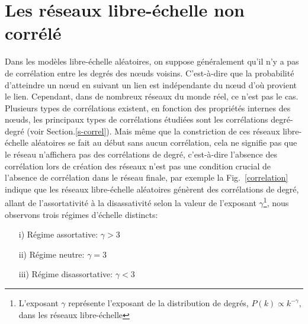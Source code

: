 \section{Les réseaux libre-échelle non corrélé}
Dans les modèles libre-échelle aléatoires, on suppose généralement qu'il n'y a pas de corrélation entre les degrés des nœuds voisins. C'est-à-dire que la probabilité d'atteindre un nœud en suivant un lien est indépendante du nœud d'où provient le lien. Cependant, dans de nombreux réseaux du monde réel, ce n'est pas le cas. Plusieurs types de corrélations existent, en fonction des propriétés internes des nœuds, les principaux types de corrélations étudiées sont les corrélations degré-degré (voir Section.\ref{s-correl}). Mais même que la constriction de ces réseaux libre-échelle aléatoires se fait au début sans aucun corrélation, cela ne signifie pas que le réseau n'affichera pas des corrélations de degré, c'est-à-dire l'absence des corrélation lors de création des réseaux n'est pas une condition crucial de l'absence de corrélation dans le réseau finale, par exemple la Fig.~\ref{correlation} indique que les réseaux libre-échelle aléatoires génèrent des corrélations de degré, allant de l'assortativité à la disassativité selon la valeur de l'exposant $\gamma$\footnote{L'exposant $\gamma$ représente l'exposant de la distribution de degrés, $P(k)\propto k^{-\gamma}$, dans les réseaux libre-échelle }, nous observons trois régimes d'échelle distincts:
\begin{itemize}
	\item[i)] Régime assortative: $\gamma>3$
	\item[ii)]Régime neutre: $\gamma=3$
	\item[iii)] Régime disassortative: $\gamma<3$
\end{itemize}

